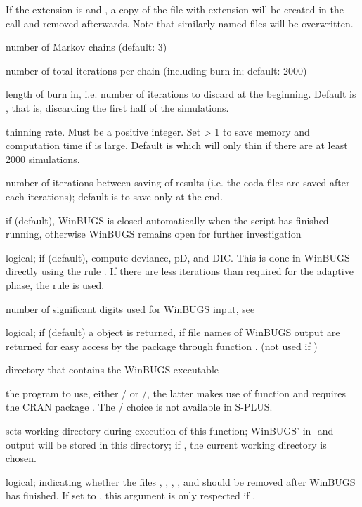 \begin{Arguments}
\begin{ldescription}
If the extension is  and ,
a copy of the file with extension  will be created
in the  call and removed afterwards.
Note that similarly named  files will be overwritten.
\item[\code{n.chains}] number of Markov chains (default: 3)
\item[\code{n.iter}] number of total iterations per chain (including burn in; default: 2000)
\item[\code{n.burnin}] length of burn in, i.e. number of iterations to discard at the beginning.
Default is , that is, discarding the first half of the simulations.
\item[\code{n.thin}] thinning rate.  Must be a positive integer.
Set  > 1 to save memory and computation time if  is large.
Default is 
which will only thin if there are at least 2000 simulations.
\item[\code{bin}] number of iterations between saving of results
(i.e. the coda files are saved after each  iterations);
default is to save only at the end.
\item[\code{debug}] if  (default), WinBUGS is closed automatically
when the script has finished running, otherwise WinBUGS remains open for further investigation
\item[\code{DIC}] logical; if  (default), compute deviance, pD, and DIC.
This is done in WinBUGS directly using the rule .
If there are less iterations than required for the adaptive phase,
the rule  is used.
\item[\code{digits}] number of significant digits used for WinBUGS input, see 
\item[\code{codaPkg}] logical; if  (default) a  object is returned,
if  file names of WinBUGS output are returned for easy access by the  package
through function . (not used if )
\item[\code{bugs.directory}] directory that contains the WinBUGS executable
\item[\code{program}] the program to use, either / or /,
the latter makes use of function  and requires the CRAN package .
The / choice is not available in S-PLUS.
\item[\code{working.directory}] sets working directory during execution of this function;
WinBUGS' in- and output will be stored in this directory;
if , the current working directory is chosen.
\item[\code{clearWD}] logical; indicating whether the files ,
, , , and
 should be removed after WinBUGS has finished.
If set to , this argument is only respected if .


\end{ldescription}
\end{Arguments}
